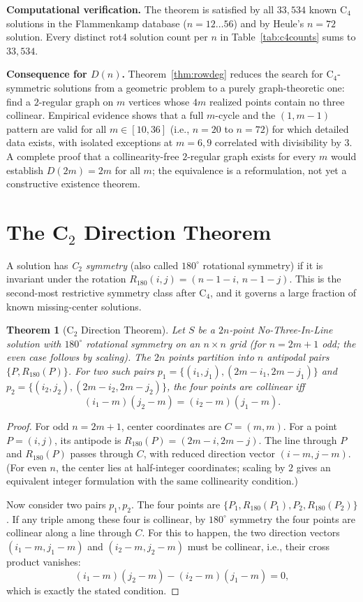 \documentclass[11pt,a4paper]{article}
\theoremstyle{plain}
\newtheorem{theorem}{Theorem}[section]
\theoremstyle{definition}
\begin{document}
\noindent\textbf{Computational verification.} The theorem is satisfied by all $33{,}534$ known C$_4$ solutions in the Flammenkamp database ($n=12\dots56$) and by Heule's $n=72$ solution. Every distinct rot4 solution count per $n$ in Table~\ref{tab:c4counts} sums to $33{,}534$.

\noindent\textbf{Consequence for $D(n)$.} Theorem~\ref{thm:rowdeg} reduces the search for C$_4$-symmetric solutions from a geometric problem to a purely graph-theoretic one: find a $2$-regular graph on $m$ vertices whose $4m$ realized points contain no three collinear. Empirical evidence shows that a full $m$-cycle and the $(1,m-1)$ pattern are valid for all $m\in[10,36]$ (i.e., $n=20$ to $n=72$) for which detailed data exists, with isolated exceptions at $m=6,9$ correlated with divisibility by $3$. A complete proof that a collinearity-free $2$-regular graph exists for every $m$ would establish $D(2m)=2m$ for all $m$; the equivalence is a reformulation, not yet a constructive existence theorem.

\section{The C$_2$ Direction Theorem}
\label{sec:c2}

A solution has \emph{C$_2$ symmetry} (also called $180^\circ$ rotational symmetry) if it is invariant under the rotation $R_{180}(i,j) = (n-1-i,\, n-1-j)$. This is the second-most restrictive symmetry class after C$_4$, and it governs a large fraction of known missing-center solutions.

\begin{theorem}[C$_2$ Direction Theorem]
\label{thm:c2}
Let $S$ be a $2n$-point No-Three-In-Line solution with $180^\circ$ rotational symmetry on an $n\times n$ grid (for $n=2m+1$ odd; the even case follows by scaling). The $2n$ points partition into $n$ antipodal pairs $\{P, R_{180}(P)\}$. For two such pairs $p_1 = \{(i_1,j_1),(2m-i_1,2m-j_1)\}$ and $p_2 = \{(i_2,j_2),(2m-i_2,2m-j_2)\}$, the four points are collinear iff
\[
(i_1-m)(j_2-m) = (i_2-m)(j_1-m).
\]
\end{theorem}

\begin{proof}
For odd $n=2m+1$, center coordinates are $C=(m,m)$. For a point $P=(i,j)$, its antipode is $R_{180}(P) = (2m-i,2m-j)$. The line through $P$ and $R_{180}(P)$ passes through $C$, with reduced direction vector $(i-m, j-m)$. (For even $n$, the center lies at half-integer coordinates; scaling by $2$ gives an equivalent integer formulation with the same collinearity condition.)

Now consider two pairs $p_1, p_2$. The four points are $\{P_1, R_{180}(P_1), P_2, R_{180}(P_2)\}$. If any triple among these four is collinear, by $180^\circ$ symmetry the four points are collinear along a line through $C$. For this to happen, the two direction vectors $(i_1-m, j_1-m)$ and $(i_2-m, j_2-m)$ must be collinear, i.e., their cross product vanishes:
\[
(i_1-m)(j_2-m) - (i_2-m)(j_1-m) = 0,
\]
which is exactly the stated condition.
\end{proof}
\end{document}
